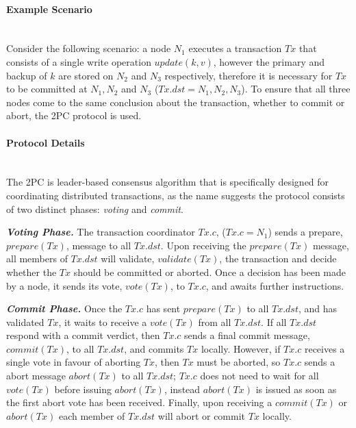            \paragraph{Example Scenario} \label{transaction_scenario} \hspace{0pt} \\	       
           Consider the following scenario: a node $N_1$ executes a transaction $Tx$ that consists of a single write operation $update(k, v)$, however the primary and backup of $k$ are stored on $N_2$ and $N_3$ respectively, therefore it is necessary for $Tx$ to be committed at $N_1, N_2$ and $N_3$ ($Tx.dst = N_1, N_2, N_3$).  To ensure that all three nodes come to the same conclusion about the transaction, whether to commit or abort, the 2PC protocol is used.  
	       
	       \paragraph{Protocol Details} \hspace{0pt} \\
	       The 2PC is leader-based consensus algorithm that is specifically designed for coordinating distributed transactions, as the name suggests the protocol consists of two distinct phases: \emph{voting} and \emph{commit}. 
	       
	       \textbf{\emph{Voting Phase.}} The transaction coordinator $Tx.c$, ($Tx.c = N_1$) sends a prepare, $prepare(Tx)$, message to all $Tx.dst$.  Upon receiving the $prepare(Tx)$ message, all members of $Tx.dst$ will validate, $validate(Tx)$, the transaction and decide whether the $Tx$ should be committed or aborted.  Once a decision has been made by a node, it sends its vote, $vote(Tx)$, to $Tx.c$, and awaits further instructions.  
	       
	       \textbf{\emph{Commit Phase.}}  Once the $Tx.c$ has sent $prepare(Tx)$ to all $Tx.dst$, and has validated $Tx$, it waits to receive a $vote(Tx)$ from all $Tx.dst$.  If all $Tx.dst$ respond with a commit verdict, then $Tx.c$ sends a final commit message, $commit(Tx)$, to all $Tx.dst$, and commits $Tx$ locally.  However, if $Tx.c$ receives a single vote in favour of aborting $Tx$, then $Tx$ must be aborted, so $Tx.c$ sends a abort message $abort(Tx)$ to all $Tx.dst$; $Tx.c$ does not need to wait for all $vote(Tx)$ before issuing $abort(Tx)$, instead $abort(Tx)$ is issued as soon as the first abort vote has been received.  Finally, upon receiving a $commit(Tx)$ or $abort(Tx)$ each member of $Tx.dst$ will abort or commit $Tx$ locally.  
	       
